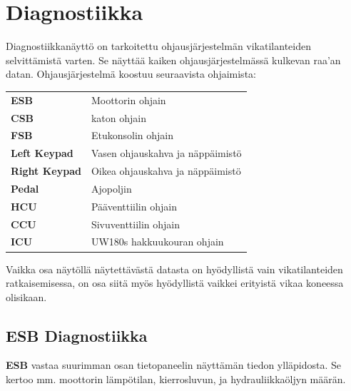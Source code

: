 \documentclass[12pt,a4paper,finnish]{uvmanual}
\begin{document}


\section{Diagnostiikka}\label{ch:system_diagnostics}

Diagnostiikkanäyttö on tarkoitettu ohjausjärjestelmän vikatilanteiden selvittämistä varten. Se näyttää kaiken ohjausjärjestelmässä kulkevan raa'an datan. Ohjausjärjestelmä koostuu seuraavista ohjaimista:

\begin{tabular}{ L{0.2\textwidth} L{0.66\textwidth} }
\textbf{ESB} & Moottorin ohjain \\
\textbf{CSB} & katon ohjain \\
\textbf{FSB} & Etukonsolin ohjain \\
\textbf{Left Keypad} & Vasen ohjauskahva ja näppäimistö \\
\textbf{Right Keypad} & Oikea ohjauskahva ja näppäimistö \\
\textbf{Pedal} & Ajopoljin \\
\textbf{HCU} & Pääventtiilin ohjain \\
\textbf{CCU} & Sivuventtiilin ohjain \\
\textbf{ICU} & UW180s hakkuukouran ohjain \\
\end{tabular}




Vaikka osa näytöllä näytettävästä datasta on hyödyllistä vain vikatilanteiden ratkaisemisessa, on osa siitä myös hyödyllistä vaikkei erityistä vikaa koneessa olisikaan.

\FloatBarrier
\subsection{ESB Diagnostiikka}\label{ch:system_diagnostics_msb}


\textbf{ESB} vastaa suurimman osan tietopaneelin näyttämän tiedon ylläpidosta. Se kertoo mm. moottorin lämpötilan, kierrosluvun, ja hydrauliikkaöljyn määrän.
\end{document}
